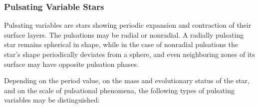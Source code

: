 \subsubsection{Pulsating Variable Stars}\label{pulsating-variable-stars}

Pulsating variables are stars showing periodic expansion and contraction
of their surface layers. The pulsations may be radial or nonradial. A
radially pulsating star remains spherical in shape, while in the case of
nonradial pulsations the star's shape periodically deviates from a
sphere, and even neighboring zones of its surface may have opposite
pulsation phases.

Depending on the period value, on the mass and evolutionary status of
the star, and on the scale of pulsational phenomena, the following types
of pulsating variables may be distinguished:

